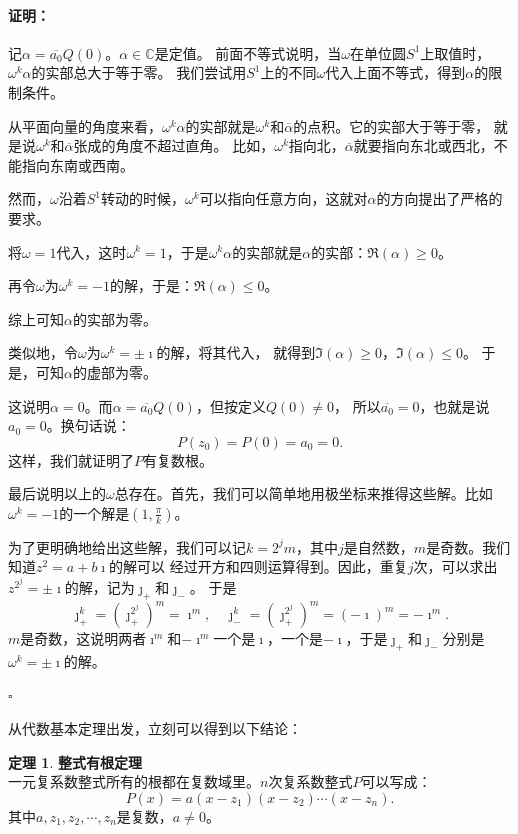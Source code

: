 \documentclass[12pt,UTF8]{ctexbook}
\theoremstyle{definition}
\newtheorem{tm}{定理}[section]
\theoremstyle{plain}
\renewenvironment{proof}{\paragraph{\textbf{证明：}}}{\hfill$\square$}
\begin{document}
\begin{appendix}
\begin{proof}
    记$\alpha = \overline{a_0} Q(0)$。$\alpha \in\mathbb{C}$是定值。
    前面不等式说明，当$\omega$在单位圆$S^1$上取值时，$\omega^k \alpha$的实部总大于等于零。
    我们尝试用$S^1$上的不同$\omega$代入上面不等式，得到$\alpha$的限制条件。

    从平面向量的角度来看，$\omega^k \alpha$的实部就是$\omega^k$和$\overline{\alpha}$的点积。它的实部大于等于零，
    就是说$\omega^k$和$\overline{\alpha}$张成的角度不超过直角。
    比如，$\omega^k$指向北，$\overline{\alpha}$就要指向东北或西北，不能指向东南或西南。

    然而，$\omega$沿着$S^1$转动的时候，$\omega^k$可以指向任意方向，这就对$\alpha$的方向提出了严格的要求。

    将$\omega = 1$代入，这时$\omega^k = 1$，于是$\omega^k \alpha$的实部就是$\alpha$的实部：$\Re(\alpha) \geqslant 0$。

    再令$\omega$为$\omega^k = -1$的解，于是：$\Re(\alpha) \leqslant 0$。%

    综上可知$\alpha$的实部为零。

    类似地，令$\omega$为$\omega^k = \pm \imath$的解，将其代入，%
    就得到$\Im(\alpha) \geqslant 0$，$\Im(\alpha) \leqslant 0$。
    于是，可知$\alpha$的虚部为零。

    这说明$\alpha = 0$。而$\alpha = \overline{a_0} Q(0)$，但按定义$Q(0)\neq 0$，
    所以$\overline{a_0} = 0$，也就是说$a_0 = 0$。换句话说：
    $$ P(z_0) = P(0) = a_0 = 0. $$
    这样，我们就证明了$P$有复数根。

    最后说明以上的$\omega$总存在。首先，我们可以简单地用极坐标来推得这些解。比如$\omega^k = -1$的一个解是$\left(1, \frac{\pi}{k}\right)$。
    
    为了更明确地给出这些解，我们可以记$k = 2^j m$，其中$j$是自然数，$m$是奇数。我们知道$z^2 = a + b\imath$的解可以
    经过开方和四则运算得到。因此，重复$j$次，可以求出$z^{2^j} = \pm \imath$的解，记为$\jmath_+$和$\jmath_-$。
    于是
    $$\jmath_+^k = \left(\jmath_+^{2^j}\right)^m = \imath^m, \quad \jmath_-^k = \left(\jmath_+^{2^j}\right)^m = (-\imath)^m = -\imath^m.$$
    $m$是奇数，这说明两者$\imath^m$和$-\imath^m$一个是$\imath$，一个是$-\imath$，于是$\jmath_+$和$\jmath_-$分别是$\omega^k = \pm \imath$的解。

\end{proof}

从代数基本定理出发，立刻可以得到以下结论：

\begin{tm}{\textbf{整式有根定理}}
    \mbox{} \\
    \indent 一元复系数整式所有的根都在复数域里。$n$次复系数整式$P$可以写成：
    $$ P(x) = a(x - z_1)(x - z_2)\cdots(x - z_n).$$
    其中$a, z_1, z_2,\cdots, z_n$是复数，$a\neq 0$。   
\end{tm}


\end{appendix}
\end{document}
